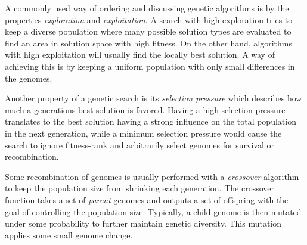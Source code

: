 A commonly used way of ordering and discussing genetic algorithms is by the properties \textit{exploration} and \textit{exploitation}. A search with high exploration tries to keep a diverse population where many possible solution types are evaluated to find an area in solution space with high fitness. On the other hand, algorithms with high exploitation will usually find the locally best solution. A way of achieving this is by keeping a uniform population with only small differences in the genomes.

Another property of a genetic search is its \textit{selection pressure} which describes how much a generations best solution is favored. Having a high selection pressure translates to the best solution having a strong influence on the total population in the next generation, while a minimum selection pressure would cause the search to ignore fitness-rank and arbitrarily select genomes for survival or recombination.

Some recombination of genomes is usually performed with a \textit{crossover} algorithm to keep the population size from shrinking each generation.  The crossover function takes a set of \textit{parent} genomes and outputs a set of offspring with the goal of controlling the population size.  Typically, a child genome is then mutated under some probability to further maintain genetic diversity. This mutation applies some small genome change.

